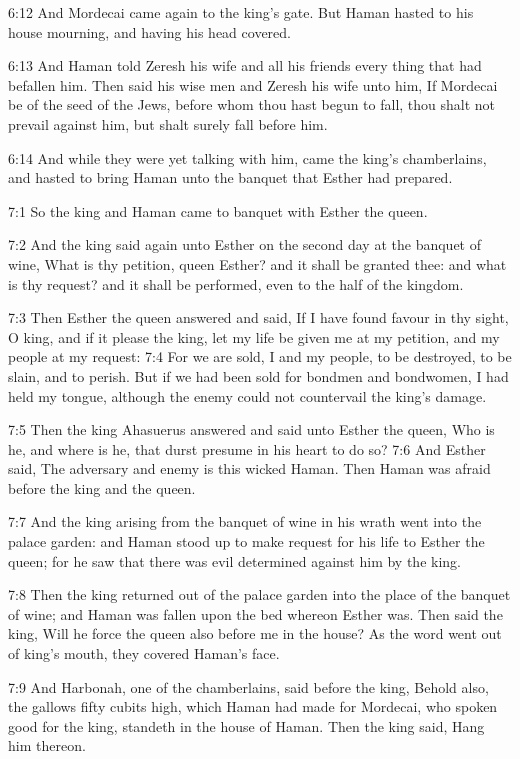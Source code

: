 6:12 And Mordecai came again to the king's gate. But Haman hasted to his house mourning, and having his head covered.

6:13 And Haman told Zeresh his wife and all his friends every thing that had befallen him. Then said his wise men and Zeresh his wife unto him, If Mordecai be of the seed of the Jews, before whom thou hast begun to fall, thou shalt not prevail against him, but shalt surely fall before him.

6:14 And while they were yet talking with him, came the king's chamberlains, and hasted to bring Haman unto the banquet that Esther had prepared.

7:1 So the king and Haman came to banquet with Esther the queen.

7:2 And the king said again unto Esther on the second day at the banquet of wine, What is thy petition, queen Esther? and it shall be granted thee: and what is thy request? and it shall be performed, even to the half of the kingdom.

7:3 Then Esther the queen answered and said, If I have found favour in thy sight, O king, and if it please the king, let my life be given me at my petition, and my people at my request: 7:4 For we are sold, I and my people, to be destroyed, to be slain, and to perish. But if we had been sold for bondmen and bondwomen, I had held my tongue, although the enemy could not countervail the king's damage.

7:5 Then the king Ahasuerus answered and said unto Esther the queen, Who is he, and where is he, that durst presume in his heart to do so?  7:6 And Esther said, The adversary and enemy is this wicked Haman.  Then Haman was afraid before the king and the queen.

7:7 And the king arising from the banquet of wine in his wrath went into the palace garden: and Haman stood up to make request for his life to Esther the queen; for he saw that there was evil determined against him by the king.

7:8 Then the king returned out of the palace garden into the place of the banquet of wine; and Haman was fallen upon the bed whereon Esther was. Then said the king, Will he force the queen also before me in the house? As the word went out of king's mouth, they covered Haman's face.

7:9 And Harbonah, one of the chamberlains, said before the king, Behold also, the gallows fifty cubits high, which Haman had made for Mordecai, who spoken good for the king, standeth in the house of Haman. Then the king said, Hang him thereon.

